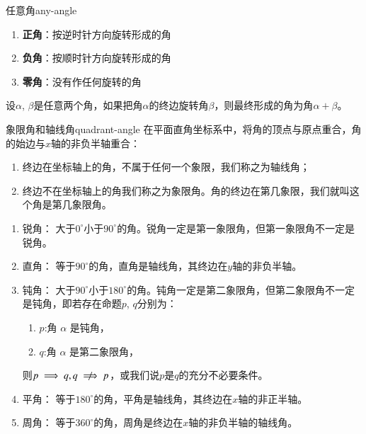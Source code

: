 \begin{definition}{任意角}{any-angle}
\begin{enumerate}
\item \textbf{正角}：按\textcolor{third}{逆时针}方向旋转形成的角
\item \textbf{负角}：按\textcolor{third}{顺时针}方向旋转形成的角
\item \textbf{零角}：\textcolor{third}{没有作任何旋转}的角
\end{enumerate}
\end{definition}


\begin{note}
设$\alpha$, $\beta$是任意两个角，如果把角$\alpha$的终边旋转角$\beta$，则最终形成的角为角$\alpha + \beta$。
\end{note}


\begin{definition}{象限角和轴线角}{quadrant-angle}
在平面直角坐标系中，将角的顶点与原点重合，角的始边与$x$轴的非负半轴重合：
\begin{enumerate}
\item 终边在坐标轴上的角，不属于任何一个象限，我们称之为\textcolor{third}{轴线角}；
\item 终边不在坐标轴上的角我们称之为\textcolor{third}{象限角}。角的终边在第几象限，我们就叫这个角是第几象限角。
\end{enumerate}
\end{definition}


\begin{remark}
\begin{enumerate}
\item 锐角： 大于$0^{\circ}$小于$90^{\circ}$的角。锐角一定是第一象限角，但第一象限角不一定是锐角。
\item 直角： 等于$90^{\circ}$的角，直角是轴线角，其终边在$y$轴的非负半轴。
\item 钝角： 大于$90^{\circ}$小于$180^{\circ}$的角。钝角一定是第二象限角，但第二象限角不一定是钝角，即若存在命题$p$, $q$分别为：
\begin{enumerate}
\item $p$:角 $\alpha $ 是钝角，
\item $q$:角 $\alpha $ 是第二象限角，
\end{enumerate}
则$p \implies q, q \centernot \implies p$，或我们说$p$是$q$的充分不必要条件。
\item 平角： 等于$180^{\circ}$的角，平角是轴线角，其终边在$x$轴的非正半轴。
\item 周角： 等于$360^{\circ}$的角，周角是终边在$x$轴的非负半轴的轴线角。
\end{enumerate}
\end{remark}


